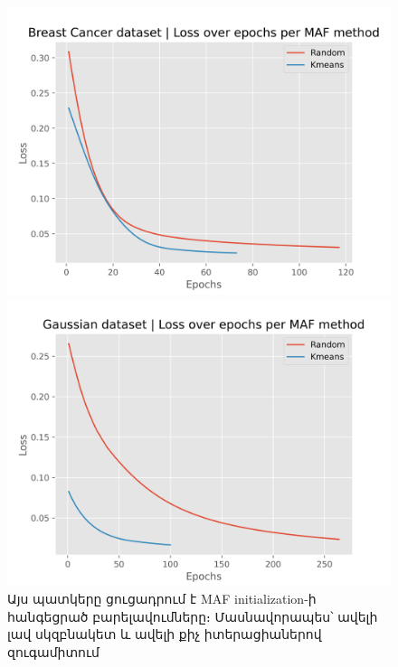 \documentclass[aspectratio=169]{beamer}
\begin{document}
\begin{frame}
    \begin{figure}
    \centering
    \begin{minipage}{0.49\textwidth}
        \includegraphics[width=\linewidth]{../../fig/breast-cancer-wisconsin_loss.png} %
    \end{minipage}\hfill
    \begin{minipage}{0.49\textwidth}
        \includegraphics[width=\linewidth]{../../fig/gaussian_df_loss.png} %
    \end{minipage}
    \caption{Այս պատկերը ցուցադրում է {\rm MAF initialization}-ի հանգեցրած բարելավումները։ Մասնավորապես՝ ավելի լավ սկզբնակետ և ավելի քիչ իտերացիաներով զուգամիտում}
    \label{fig:side_by_side}
\end{figure}
\end{frame}
\end{document}

